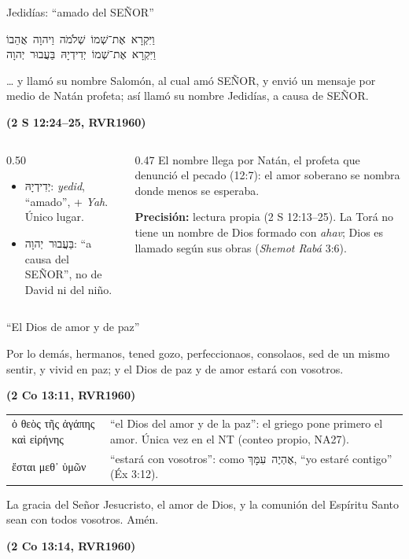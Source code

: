 \documentclass[hyperref={bookmarks=false},aspectratio=169]{beamer}
\newcommand{\heb}[1]{\mbox{\foreignlanguage{hebrew}{#1}}}
\newcommand{\grc}[1]{\foreignlanguage{ancientgreek}{#1}}
\newcommand{\SENOR}{S{\fontsize{0.78em}{1em}\selectfont EÑOR}}
\newcommand{\fuente}[1]{\par\hfill{\upshape\bfseries\footnotesize\textcolor{azul}{#1}}}
\newcommand{\precision}[1]{{\footnotesize\color{gris}\textbf{Precisión:} #1}}
\begin{document}
\begin{frame}{Jedidías: ``amado del \SENOR''}
\begin{center}\heb{וַיִּקְרָא אֶת־שְׁמוֹ שְׁלֹמֹה וַיהוָה אֲהֵבוֹ}\\[1pt]\heb{וַיִּקְרָא אֶת־שְׁמוֹ יְדִידְיָהּ בַּעֲבוּר יְהוָה}\end{center}
\begin{cita}\ldots{} y llamó su nombre Salomón, al cual amó \SENOR, y envió un mensaje por medio de Natán profeta; así llamó su nombre Jedidías, a causa de \SENOR.\fuente{(2 S 12:24--25, RVR1960)}\end{cita}
\begin{columns}[t,onlytextwidth]
\begin{column}{0.50\textwidth}\scriptsize
\begin{itemize}
\item \heb{יְדִידְיָהּ}: \emph{yedid}, ``amado'', + \emph{Yah}. Único lugar.
\item \heb{בַּעֲבוּר יְהוָה}: ``a causa del \SENOR'', no de David ni del niño.
\end{itemize}
\end{column}
\begin{column}{0.47\textwidth}\scriptsize
El nombre llega por Natán, el profeta que denunció el pecado (12:7): el amor soberano se nombra donde menos se esperaba.\par
\precision{lectura propia (2 S 12:13--25). La Torá no tiene un nombre de Dios formado con \emph{ahav}; Dios es llamado según sus obras (\emph{Shemot Rabá} 3:6).}
\end{column}
\end{columns}
\end{frame}

\begin{frame}{``El Dios de amor y de paz''}
\begin{cita}Por lo demás, hermanos, tened gozo, perfeccionaos, consolaos, sed de un mismo sentir, y vivid en paz; y el Dios de paz y de amor estará con vosotros.\fuente{(2 Co 13:11, RVR1960)}\end{cita}
\renewcommand{\arraystretch}{1.12}\scriptsize
\begin{tabular}{@{}>{\RaggedRight\arraybackslash}p{3.6cm}>{\RaggedRight\arraybackslash}p{8.3cm}@{}}
\grc{ὁ θεὸς τῆς ἀγάπης καὶ εἰρήνης} & ``el Dios del amor y de la paz'': el griego pone primero el amor. Única vez en el NT (conteo propio, NA27). \\
\grc{ἔσται μεθ᾽ ὑμῶν} & ``estará con vosotros'': como \heb{אֶהְיֶה עִמָּךְ}, ``yo estaré contigo'' (Éx 3:12). \\
\end{tabular}\par\medskip
\begin{cita}La gracia del Señor Jesucristo, el amor de Dios, y la comunión del Espíritu Santo sean con todos vosotros. Amén.\fuente{(2 Co 13:14, RVR1960)}\end{cita}
\end{frame}
\end{document}
